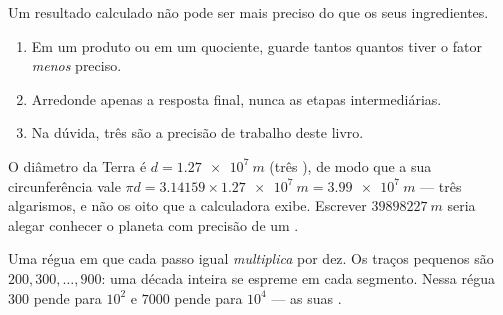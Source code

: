 \begin{method}\label{met:g10:orders-of-magnitude:sigfig}
Um resultado calculado não pode ser mais preciso do que os seus
ingredientes.
\begin{enumerate}
  \item Em um produto ou em um quociente, guarde tantos  quantos tiver o fator \emph{menos} preciso.
  \item Arredonde apenas a resposta final, nunca as etapas
        intermediárias.
  \item Na dúvida, três  são a precisão de
        trabalho deste livro.
\end{enumerate}
\end{method}

\begin{example}\label{ex:g10:orders-of-magnitude:sigfig}
O diâmetro da Terra é $d = \qty{1.27e7}{m}$ (três ), de modo que a sua circunferência vale
$\pi d = \num{3.14159} \times \qty{1.27e7}{m} = \qty{3.99e7}{m}$ ---
três algarismos, e não os oito que a calculadora exibe. Escrever
$\qty{39898227}{m}$ seria alegar conhecer o planeta com precisão de um
.
\end{example}

\begin{omfigure}

{\small Uma régua em que cada passo igual \emph{multiplica} por dez. Os
traços pequenos são $200, 300, \dots, 900$: uma década inteira se
espreme em cada segmento. Nessa régua $\num{300}$ pende para $10^{2}$ e
$\num{7000}$ pende para $10^{4}$ --- as suas .}
\end{omfigure}


